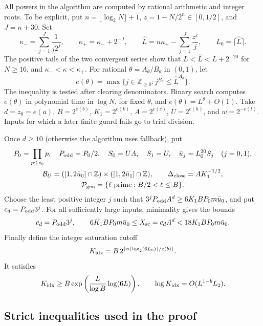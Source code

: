All powers in the algorithm are computed by rational arithmetic and
integer roots.  To be explicit, put \(n=\lfloor\log_2N\rfloor+1\),
\(z=1-N/2^n\in[0,1/2]\), and \(J=n+30\).  Set
\[
 \kappa_- =\sum_{j=1}^J\frac1{j2^j},\qquad
 \kappa_+=\kappa_-+2^{-J},\qquad
 \widehat L=n\kappa_+-\sum_{j=1}^J\frac{z^j}{j},\qquad
 L_0=\lceil\widehat L\rceil.
\]
The positive tails of the two convergent series show that
\(L<\widehat L<L+2^{-20}\) for \(N\ge16\), and
\(\kappa_-<\kappa<\kappa_+\).  For rational \(\theta=A_\theta/B_\theta\)
in \((0,1)\), let
\[
 e(\theta)=\max\{j\in\mathbb Z_{\ge0}:
       j^{B_\theta}\le \widehat L^{A_\theta}\}.
\]
The inequality is tested after clearing denominators.  Binary search
computes \(e(\theta)\) in polynomial time in \(\log N\), for fixed
\(\theta\), and \(e(\theta)=L^\theta+O(1)\).
Take \(d=z_0=e(a)\), \(B=2^{e(b)}\), \(K_1=2^{e(k)}\),
\(A=2^{e(c)}\), \(U=2^{e(h)}\), and \(w=2^{-e(t)}\).
Inputs for which a later finite guard fails go to trial division.

Once \(d\ge10\) (otherwise the algorithm uses fallback), put
\begin{gather*}
 P_0=\prod_{p\le z_0}p,\quad P_{\rm odd}=P_0/2,
 \quad S_0=UA,\quad S_1=U,\quad
 \bar u_j=L_0^{20}S_j\quad(j=0,1),\\
 \mathcal B_U=([1,2\bar u_0]\cap\mathbb Z)
                 \times([1,2\bar u_1]\cap\mathbb Z),
 \qquad \Delta_{\rm close}=AK_1^{-1/2},\\
 \mathcal P_{\rm gen}=\{\ell\text{ prime}:B/2<\ell\le B\}.
\end{gather*}
Choose the least positive integer \(j\) such that
\(3^jP_{\rm odd}A^d\ge6K_1BP_0m\bar u_0\), and put
\(c_d=P_{\rm odd}3^j\).  For all sufficiently large inputs,
minimality gives the bounds
\begin{equation}\label{eq:scale}
 c_d=P_{\rm odd}3^j,
 \qquad
 6K_1BP_0m\bar u_0\le X_{\rm sc}=c_dA^d
            <18K_1BP_0m\bar u_0.
\end{equation}
Finally define the integer saturation cutoff
\begin{equation}\label{eq:kidx}
 K_{\rm idx}=B\,2^{\left\lceil
       n\lceil\log_2(6L_0)\rceil/e(b)\right\rceil}.
\end{equation}
It satisfies
\begin{equation}\label{eq:kidx-lower}
 K_{\rm idx}\ge B\exp\left(\frac{L}{\log B}\log(6L)\right),
 \qquad
 \log K_{\rm idx}=O(L^{1-b}L_2).
\end{equation}

\subsection{Strict inequalities used in the proof}

